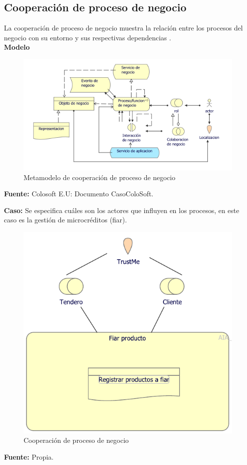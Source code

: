 	\subsection{Cooperación de proceso de negocio}
	{ La cooperación de proceso de negocio muestra la relación entre los procesos del negocio con su entorno y sus respectivas dependencias \cite{archimate}.\\
		
		\textbf{Modelo}\\
		\begin{figure}[H]
			\centering
			\includegraphics[width=0.8\linewidth]{development/cooperacionproceso.png}
			\caption{Metamodelo de cooperación de proceso de negocio}
		\end{figure}
		\begin{center}
			\textbf{Fuente:} Colosoft E.U: Documento CasoColoSoft.
		\end{center}
		\hfill \break
		
		\textbf{Caso:} Se especifica cuáles son los actores que influyen en los procesos, en este caso es la gestión de microcréditos (fiar).
		
		
		\begin{figure}[H]
			\centering
			\includegraphics[width=0.6\linewidth]{development/cooperacionproceso.pdf}
			\caption{Cooperación de proceso de negocio}
		\end{figure}
		\begin{center}
			\textbf{Fuente:} Propia.
		\end{center}
		\hfill
	}
	
